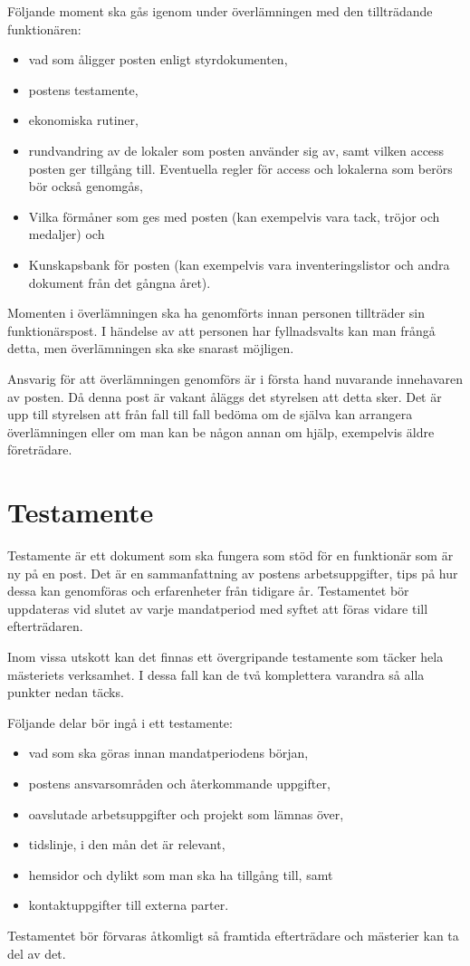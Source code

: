 \documentclass{dsekguideline}
\begin{document}
Följande moment ska gås igenom under överlämningen med den tillträdande
funktionären:
\begin{itemize}
    \item vad som åligger posten enligt styrdokumenten,
    \item postens testamente,
    \item ekonomiska rutiner,
    \item rundvandring av de lokaler som posten använder sig av, samt vilken
      access posten ger tillgång till. Eventuella regler för access och
      lokalerna som berörs bör också genomgås,
    \item Vilka förmåner som ges med posten (kan exempelvis vara tack, tröjor
      och medaljer) och
    \item Kunskapsbank för posten (kan exempelvis vara inventeringslistor och
      andra dokument från det gångna året).
\end{itemize}
Momenten i överlämningen ska ha genomförts innan personen tillträder sin
funktionärspost. I händelse av att personen har fyllnadsvalts kan man frångå
detta, men överlämningen ska ske snarast möjligen.

Ansvarig för att överlämningen genomförs är i första hand nuvarande innehavaren
av posten. Då denna post är vakant åläggs det styrelsen att detta sker. Det är
upp till styrelsen att från fall till fall bedöma om de själva kan arrangera
överlämningen eller om man kan be någon annan om hjälp, exempelvis äldre
företrädare.

\section{Testamente}

   Testamente är ett dokument som ska fungera som stöd för
  en funktionär som är ny på en post. Det är en sammanfattning av postens
  arbetsuppgifter, tips på hur dessa kan genomföras och erfarenheter från
  tidigare år. Testamentet bör uppdateras vid slutet av varje mandatperiod med
  syftet att föras vidare till efterträdaren.

  Inom vissa utskott kan det finnas ett övergripande testamente som täcker hela
  mästeriets verksamhet. I dessa fall kan de två komplettera varandra så alla
  punkter nedan täcks.

  Följande delar bör ingå i ett testamente:
  \begin{itemize}
    \item vad som ska göras innan mandatperiodens början,
    \item postens ansvarsområden och återkommande uppgifter,
    \item oavslutade arbetsuppgifter och projekt som lämnas över,
    \item tidslinje, i den mån det är relevant,
    \item hemsidor och dylikt som man ska ha tillgång till, samt
    \item kontaktuppgifter till externa parter.
  \end{itemize}

Testamentet bör förvaras åtkomligt så framtida efterträdare och mästerier kan ta
del av det.
\end{document}

